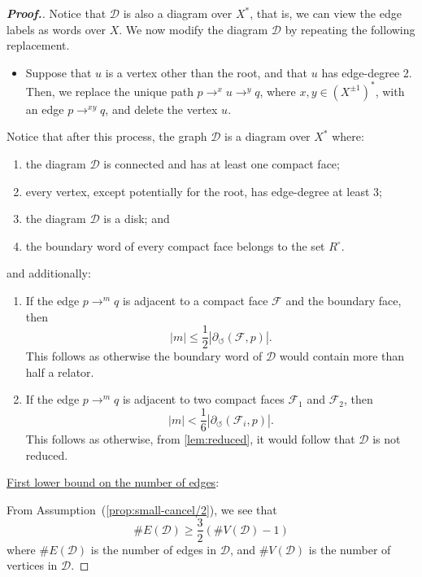 \documentclass[11pt,a4paper,reqno]{amsart}
\theoremstyle{plain}
\theoremstyle{definition}
\theoremstyle{definition}
\renewcommand\leq\leqslant
\renewcommand\geq\geqslant
\newenvironment{myproof}{\begin{proof}[\normalfont\bfseries Proof.]}{\end{proof}}
\begin{document}
\begin{myproof}
Notice that $\mathcal D$ is also a diagram over $X^*$, that is, we can view the edge labels as words over $X$.
We now modify the diagram $\mathcal D$ by repeating the following replacement.
\begin{itemize}
  \item Suppose that $u$ is a vertex other than the root, and that $u$ has edge-degree 2.
    Then, we replace the unique path $p \to^x u \to^y q$, where $x,y\in (X^{\pm 1})^*$, with an edge $p \to^{xy} q$, and delete the vertex $u$.
\end{itemize}
Notice that after this process, the graph $\mathcal D$ is a diagram over $X^*$ where:
\begin{enumerate}
  \item\label{prop:small-cancel/1} the diagram $\mathcal D$ is connected and has at least one compact face;
  \item\label{prop:small-cancel/2} every vertex, except potentially for the root, has edge-degree at least 3;
  \item\label{prop:small-cancel/3} the diagram $\mathcal D$ is a disk; and
  \item\label{prop:small-cancel/4} the boundary word of every compact face belongs to the set $R^\circ$.
\end{enumerate}
and additionally:
\begin{enumerate}[label=(\Alph*),ref=\Alph*]
  \item\label{prop:small-cancel/A}
    If the edge $p\to^m q$ is adjacent to a compact face $\mathcal F$ and the boundary face, then \[|m|\leq \frac{1}{2}|\partial_\circlearrowleft (\mathcal F, p)|.\]
    This follows as otherwise the boundary word of $\mathcal D$ would contain more than half a relator.
  \item\label{prop:small-cancel/B}
    If the edge $p\to^m q$ is adjacent to two compact faces $\mathcal F_1$ and $\mathcal F_2$, then \[|m|< \frac{1}{6}|\partial_\circlearrowleft (\mathcal F_i, p)|.\]
    This follows as otherwise, from \cref{lem:reduced}, it would follow that $\mathcal D$ is not reduced.
\end{enumerate}

\medskip
\noindent
\underline{First lower bound on the number of edges}:\nopagebreak

\smallskip\nopagebreak
\noindent\nopagebreak
From Assumption~(\ref{prop:small-cancel/2}), we see that
\begin{equation}\label{small-cancel/eq1}
  \#E(\mathcal D) \geq \frac{3}{2}\left( \#V(\mathcal D) - 1 \right)
\end{equation}
where $\#E(\mathcal D)$ is the number of edges in $\mathcal D$, and $\#V(\mathcal D)$ is the number of vertices in $\mathcal D$.


\end{myproof}
\end{document}
